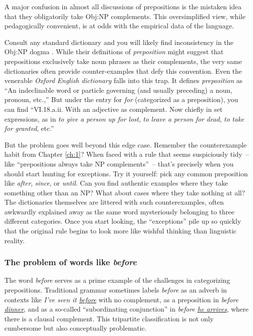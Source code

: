 A major confusion in almost all discussions of prepositions is the mistaken idea that they obligatorily take Obj:NP complements. This oversimplified view, while pedagogically convenient, is at odds with the empirical data of the language.

Consult any standard dictionary and you will likely find inconsistency in the Obj:NP dogma \autocite{reynolds2025}. While their definitions of \textit{preposition} might suggest that prepositions exclusively take noun phrases as their complements, the very same dictionaries often provide counter-examples that defy this convention. Even the venerable \textit{Oxford English dictionary} falls into this trap. It defines \textit{preposition} as ``An indeclinable word or particle governing (and usually preceding) a noun, pronoun, etc.,'' But under the entry for \textit{for} (categorized as a preposition), you can find ``VI.18.a.ii. With an adjective as complement. Now chiefly in set expressions, as in \textit{to give a person up for lost}, \textit{to leave a person for dead}, \textit{to take for granted}, etc.'' 

But the problem goes well beyond this edge case. Remember the counterexample habit from Chapter \ref{ch:1}? When faced with a rule that seems suspiciously tidy~-- like ``prepositions always take NP complements''~-- that's precisely when you should start hunting for exceptions. Try it yourself: pick any common preposition like \textit{after}, \textit{since}, or \textit{until}. Can you find authentic examples where they take something other than an NP? What about cases where they take nothing at all? The dictionaries themselves are littered with such counterexamples, often awkwardly explained away as the same word mysteriously belonging to three different categories. Once you start looking, the ``exceptions'' pile up so quickly that the original rule begins to look more like wishful thinking than linguistic reality.

\subsubsection*{The problem of words like \textit{before}} \label{sec:likebefore}

The word \textit{before} serves as a prime example of the challenges in categorizing prepositions. Traditional grammar sometimes labels \textit{before} as an adverb in contexts like \textit{I've seen it \uline{before}} with no complement, as a preposition in \textit{before \uline{dinner}}, and as a so-called ``subordinating conjunction'' in \textit{before \uline{he arrives}}, where there is a clausal complement. This tripartite classification is not only cumbersome but also conceptually problematic.

